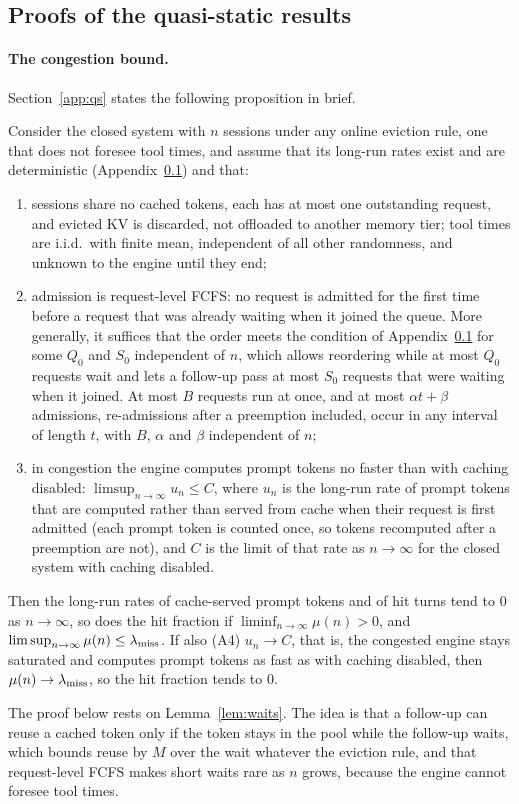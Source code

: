 \subsection{Proofs of the quasi-static results}\label{app:proofs}

\paragraph{The congestion bound.} Section~\ref{app:qs} states the following proposition in brief.

\begin{proposition}\label{prop:A}
Consider the closed system with $n$ sessions under any online eviction rule, one that does not foresee tool times, and assume that its long-run rates exist and are deterministic (Appendix~\ref{app:proofs}) and that:
\begin{enumerate}[label=(A\arabic*),leftmargin=*]
\item sessions share no cached tokens, each has at most one outstanding request, and evicted KV is discarded, not offloaded to another memory tier; tool times are i.i.d.\ with finite mean, independent of all other randomness, and unknown to the engine until they end;
\item admission is request-level FCFS: no request is admitted for the first time before a request that was already waiting when it joined the queue. More generally, it suffices that the order meets the condition of Appendix~\ref{app:proofs} for some $Q_0$ and $S_0$ independent of $n$, which allows reordering while at most $Q_0$ requests wait and lets a follow-up pass at most $S_0$ requests that were waiting when it joined. At most $B$ requests run at once, and at most $\alpha t+\beta$ admissions, re-admissions after a preemption included, occur in any interval of length $t$, with $B$, $\alpha$ and $\beta$ independent of $n$;
\item in congestion the engine computes prompt tokens no faster than with caching disabled: $\limsup_{n\to\infty}u_n\le C$, where $u_n$ is the long-run rate of prompt tokens that are computed rather than served from cache when their request is first admitted (each prompt token is counted once, so tokens recomputed after a preemption are not), and $C$ is the limit of that rate as $n\to\infty$ for the closed system with caching disabled.
\end{enumerate}
Then the long-run rates of cache-served prompt tokens and of hit turns tend to 0 as $n\to\infty$, so does the hit fraction if $\liminf_{n\to\infty}\mu(n)>0$, and $\limsup_{n\to\infty}\mu(n)\le\lambda_{\mathrm{miss}}$. If also (A4) $u_n\to C$, that is, the congested engine stays saturated and computes prompt tokens as fast as with caching disabled, then $\mu(n)\to\lambda_{\mathrm{miss}}$, so the hit fraction tends to 0.
\end{proposition}
\noindent The proof below rests on Lemma~\ref{lem:waits}. The idea is that a follow-up can reuse a cached token only if the token stays in the pool while the follow-up waits, which bounds reuse by $M$ over the wait whatever the eviction rule, and that request-level FCFS makes short waits rare as $n$ grows, because the engine cannot foresee tool times.

